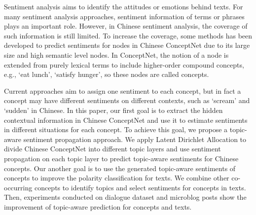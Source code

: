 Sentiment analysis aims to identify the attitudes or emotions behind texts. For many sentiment analysis approaches, sentiment information of terms or phrases plays an important role. However, in Chinese sentiment analysis, the coverage of such information is still limited. To increase the coverage, some methods has been developed to predict sentiments for nodes in Chinese ConceptNet due to its large size and high semantic level nodes. In ConceptNet, the notion of a node is extended from purely lexical terms to include higher-order compound concepts, e.g., `eat lunch', `satisfy hunger', so these nodes are called concepts. 

Current approaches aim to assign one sentiment to each concept, but in fact a concept may have different sentiments on different contexts, such as `scream' and `sudden' in Chinese. In this paper, our first goal is to extract the hidden contextual information in Chinese ConceptNet and use it to estimate sentiments in different situations for each concept. To achieve this goal, we propose a topic-aware sentiment propagation approach. We apply Latent Dirichlet Allocation to divide Chinese ConceptNet into different topic layers and use sentiment propagation on each topic layer to predict topic-aware sentiments for Chinese concepts. Our another goal is to use the generated topic-aware sentiments of concepts to improve the polarity classification for texts. We combine other co-occurring concepts to identify topics and select sentiments for concepts in texts. Then, experiments conducted on dialogue dataset and microblog posts show the improvement of topic-aware prediction for concepts and texts. 